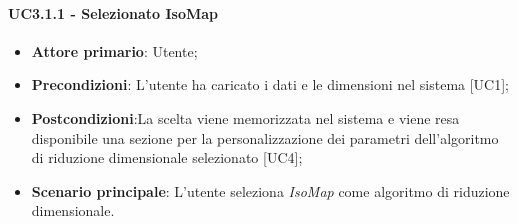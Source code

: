\paragraph{UC3.1.1 - Selezionato IsoMap}
\begin{itemize}
	\item \textbf{Attore primario}: Utente;
	\item \textbf{Precondizioni}: L'utente ha caricato i dati e le dimensioni nel sistema [UC1];
	\item \textbf{Postcondizioni}:La scelta viene memorizzata nel sistema e viene resa disponibile una sezione per la personalizzazione dei parametri dell'algoritmo di riduzione dimensionale selezionato [UC4];
	\item \textbf{Scenario principale}: L'utente seleziona \textit{IsoMap} come algoritmo di riduzione dimensionale.
\end{itemize}